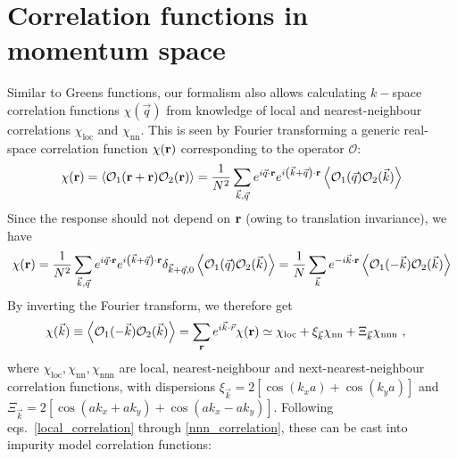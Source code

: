 \documentclass[reprint,hidelinks]{revtex4-2}
\begin{document}
\section{Correlation functions in momentum space}
Similar to Greens functions, our formalism also allows calculating \(k-\)space correlation functions \(\chi(\vec q)\) from knowledge of local and nearest-neighbour correlations \(\chi_\text{loc}\) and \(\chi_\text{nn}\). This is seen by Fourier transforming a generic real-space correlation function \(\chi({\bf r})\) corresponding to the operator \(\mathcal{O}\):
\begin{equation}\begin{aligned}
	\chi({\bf r}) = \left<\mathcal{O}_1 ({\bf r} + {\bf r}) \mathcal{O}_2({\bf r})\right> = \frac{1}{N^2}\sum_{\vec k, \vec q} e^{i \vec q \cdot {\bf r}}e^{i \left(\vec k + \vec q\right) \cdot {\bf r}}\left<\mathcal{O}_1 (\vec q) \mathcal{O}_2(\vec k)\right>
\end{aligned}\end{equation}
Since the response should not depend on \({\bf r}\) (owing to translation invariance), we have
\begin{equation}\begin{aligned}
	\chi({\bf r}) = \frac{1}{N^2}\sum_{\vec k, \vec q} e^{i \vec q \cdot {\bf r}}e^{i \left(\vec k + \vec q\right) \cdot {\bf r}}\delta_{\vec k + \vec q, 0}\left<\mathcal{O}_1 (\vec q) \mathcal{O}_2(\vec k)\right> = \frac{1}{N}\sum_{\vec k} e^{-i \vec k \cdot {\bf r}}\left<\mathcal{O}_1 (-\vec k) \mathcal{O}_2(\vec k)\right>
\end{aligned}\end{equation}
By inverting the Fourier transform, we therefore get
\begin{equation}\begin{aligned}
	\chi(\vec k) &\equiv \left<\mathcal{O}_1 (-\vec k) \mathcal{O}_2(\vec k)\right> = \sum_{{\bf r}}e^{i \vec{k}\cdot\vec{r}} \chi({\bf r}) \simeq \chi_\text{loc} + \xi_{\vec k} \chi_\text{nn} + \Xi_{\vec k}\chi_\text{nnn}~,
\end{aligned}\end{equation}
where \(\chi_\text{loc},\chi_\text{nn},\chi_\text{nnn}\) are local, nearest-neighbour and next-nearest-neighbour correlation functions, with dispersions \(\xi_{\vec k} = 2\left[\cos(k_x a) + \cos\left(k_y a\right)\right] \) and \(\Xi_{\vec k} = 2\left[\cos \left(ak_x + ak_y\right) + \cos \left( ak_x - ak_y \right) \right] \). Following eqs.~\ref{local_correlation} through \ref{nnn_correlation}, these can be cast into impurity model correlation functions:
\end{document}
